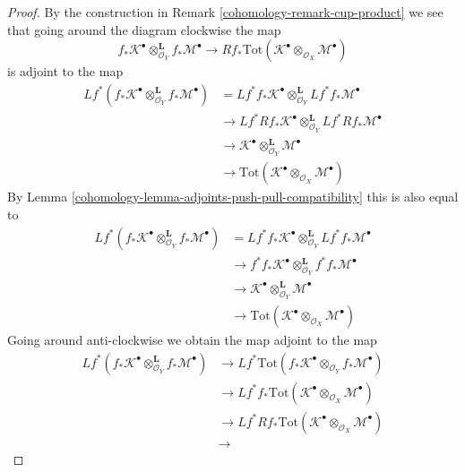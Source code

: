 \begin{proof}

By the construction in Remark \ref{cohomology-remark-cup-product} we see that
going around the diagram clockwise the map
$$
f_*\mathcal{K}^\bullet
\otimes_{\mathcal{O}_Y}^\mathbf{L}
f_*\mathcal{M}^\bullet
\longrightarrow
Rf_*\text{Tot}(\mathcal{K}^\bullet
\otimes_{\mathcal{O}_X}
\mathcal{M}^\bullet)
$$
is adjoint to the map
\begin{align*}
Lf^*(f_*\mathcal{K}^\bullet
\otimes_{\mathcal{O}_Y}^\mathbf{L}
f_*\mathcal{M}^\bullet)
& =
Lf^*f_*\mathcal{K}^\bullet
\otimes_{\mathcal{O}_Y}^\mathbf{L}
Lf^*f_*\mathcal{M}^\bullet \\
& \to
Lf^*Rf_*\mathcal{K}^\bullet
\otimes_{\mathcal{O}_Y}^\mathbf{L}
Lf^*Rf_*\mathcal{M}^\bullet \\
& \to
\mathcal{K}^\bullet
\otimes_{\mathcal{O}_Y}^\mathbf{L}
\mathcal{M}^\bullet \\
& \to
\text{Tot}(\mathcal{K}^\bullet
\otimes_{\mathcal{O}_X}
\mathcal{M}^\bullet)
\end{align*}
By Lemma \ref{cohomology-lemma-adjoints-push-pull-compatibility} this is also equal to
\begin{align*}
Lf^*(f_*\mathcal{K}^\bullet
\otimes_{\mathcal{O}_Y}^\mathbf{L}
f_*\mathcal{M}^\bullet)
& =
Lf^*f_*\mathcal{K}^\bullet
\otimes_{\mathcal{O}_Y}^\mathbf{L}
Lf^*f_*\mathcal{M}^\bullet \\
& \to
f^*f_*\mathcal{K}^\bullet
\otimes_{\mathcal{O}_Y}^\mathbf{L}
f^*f_*\mathcal{M}^\bullet \\
& \to
\mathcal{K}^\bullet
\otimes_{\mathcal{O}_Y}^\mathbf{L}
\mathcal{M}^\bullet \\
& \to
\text{Tot}(\mathcal{K}^\bullet
\otimes_{\mathcal{O}_X}
\mathcal{M}^\bullet)
\end{align*}
Going around anti-clockwise we obtain the map adjoint to the map
\begin{align*}
Lf^*(f_*\mathcal{K}^\bullet
\otimes_{\mathcal{O}_Y}^\mathbf{L}
f_*\mathcal{M}^\bullet)
& \to
Lf^*\text{Tot}(
f_*\mathcal{K}^\bullet
\otimes_{\mathcal{O}_Y}
f_*\mathcal{M}^\bullet) \\
& \to
Lf^*f_*\text{Tot}(\mathcal{K}^\bullet
\otimes_{\mathcal{O}_X}
\mathcal{M}^\bullet) \\
& \to
Lf^*Rf_*\text{Tot}(\mathcal{K}^\bullet
\otimes_{\mathcal{O}_X}
\mathcal{M}^\bullet) \\
& \to

\end{align*}
\end{proof}
